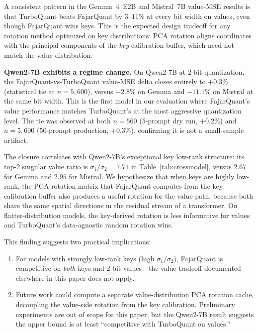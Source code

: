 \documentclass{article}
\begin{document}
A consistent pattern in the Gemma~4~E2B and Mistral~7B value-MSE
results is that TurboQuant beats FajarQuant by $3$--$11\%$ at every
bit width on values, even though FajarQuant wins keys. This is the
expected design tradeoff for any rotation method optimized on key
distributions: PCA rotation aligns coordinates with the principal
components of the \emph{key} calibration buffer, which need not match
the value distribution.

\textbf{Qwen2-7B exhibits a regime change.} On Qwen2-7B at 2-bit
quantization, the FajarQuant-vs-TurboQuant value-MSE delta closes
entirely to $+0.3\%$ (statistical tie at $n{=}5{,}600$), versus
$-2.8\%$ on Gemma and $-11.1\%$ on Mistral at the same bit width.
This is the first model in our evaluation where FajarQuant's value
performance matches TurboQuant's at the most aggressive quantization
level. The tie was observed at both $n{=}560$ (5-prompt dry run,
$+0.2\%$) and $n{=}5{,}600$ (50-prompt production, $+0.3\%$),
confirming it is not a small-sample artifact.

The closure correlates with Qwen2-7B's exceptional key low-rank
structure: its top-2 singular value ratio is $\sigma_1/\sigma_2 = 7.71$
in Table~\ref{tab:crossmodel}, versus $2.67$ for Gemma and $2.95$ for
Mistral. We hypothesize that when keys are highly low-rank, the PCA
rotation matrix that FajarQuant computes from the key calibration
buffer also produces a useful rotation for the value path, because
both share the same spatial directions in the residual stream of a
transformer. On flatter-distribution models, the key-derived rotation
is less informative for values and TurboQuant's data-agnostic random
rotation wins.

This finding suggests two practical implications:
\begin{enumerate}[nosep]
\item For models with strongly low-rank keys (high
$\sigma_1/\sigma_2$), FajarQuant is competitive on \emph{both} keys
and 2-bit values---the value tradeoff documented elsewhere in this
paper does not apply.
\item Future work could compute a separate value-distribution PCA
rotation cache, decoupling the value-side rotation from the key
calibration. Preliminary experiments are out of scope for this paper,
but the Qwen2-7B result suggests the upper bound is at least
``competitive with TurboQuant on values.''
\end{enumerate}

\end{document}
